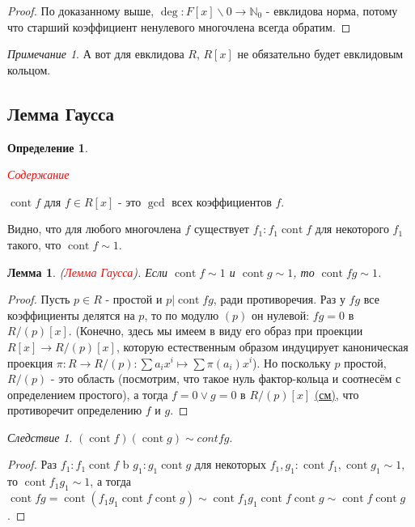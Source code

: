\documentclass[a4paper,100pt]{article}
\theoremstyle{indented}
\newtheorem{lemma}{Лемма}
\theoremstyle{definition}
\newtheorem{defn}{Определение}
\theoremstyle{remark}
\newtheorem{remark}{Примечание}
\newtheorem{cons}{Следствие}
\DeclareMathOperator{\cont}{cont}
\begin{document}
\begin{proof}
    По доказанному выше, $\deg: F[x]\backslash 0\rightarrow \mathbb{N}_0$ - евклидова норма, потому что старший коэффициент ненулевого многочлена всегда обратим.
\end{proof}

\begin{remark}
    А вот для евклидова $R$, $R[x]$ не обязательно будет евклидовым кольцом.
\end{remark}

\resetall

\subsection{Лемма Гаусса}

\begin{defn}
    \hypertarget{n30}{\textcolor{red}{\textit{Содержание}}} $\cont f$ для $f\in R[x]$ - это $\gcd$ всех коэффициентов $f$.
\end{defn}

Видно, что для любого многочлена $f$ существует $f_1:f_1\cont f$ для некоторого $f_1$ такого, что $\cont f\sim 1$.\\

\begin{lemma}
    (\hypertarget{n31}{\textcolor{red}{\textit{Лемма Гаусса}}}). Если $\cont f\sim 1$ и $\cont g\sim 1$, то $\cont fg \sim 1$.
\end{lemma}

\begin{proof}
    Пусть $p\in R$ - простой и $p\vert \cont fg$, ради противоречия. Раз у $fg$ все коэффициенты делятся на $p$, то по модулю $(p)$ он нулевой: $fg=0$ в $R/(p)[x]$. (Конечно, здесь мы имеем в виду его образ при проекции $R[x]\rightarrow R/(p)[x]$, которую естественным образом индуцирует каноническая проекция $\pi: R\rightarrow R/(p):\sum a_i x^i\mapsto \sum \pi (a_i)x^i$). Но поскольку $p$ простой, $R/(p)$ - это область (посмотрим, что такое нуль фактор-кольца и соотнесём с определением простого), а тогда $f=0 \vee g=0$ в $R/(p)[x]$ \hyperlink{t3}{(см)}, что противоречит определению $f$ и $g$.
\end{proof}

\begin{cons}
    $(\cont f)(\cont g)\sim cont fg$.
\end{cons}

\begin{proof}
    Раз $f_1:f_1\cont f$ b $g_1:g_1\cont g$ для некоторых $f_1, g_1 :\cont f_1, \cont g_1\sim 1$, то $\cont f_1g_1\sim 1$, а тогда $\cont fg=\cont (f_1g_1\cont f \cont g)\sim \cont f_1 g_1 \cont f \cont g\sim \cont f\cont g$.
\end{proof}
\end{document}
